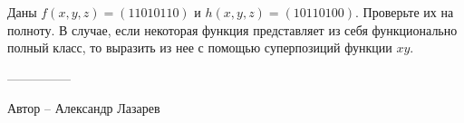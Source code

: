 \question
Даны $f(x, y, z) = (11010110)$ и $h(x, y, z) = (10110100)$. Проверьте их на полноту. В случае, если некоторая функция представляет из себя функционально полный класс, то выразить из нее с помощью суперпозиций функции $xy$.

---------------

Автор -- Александр Лазарев